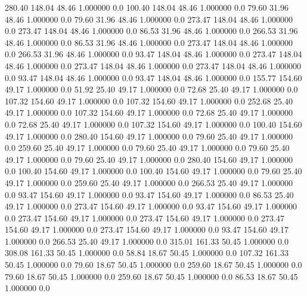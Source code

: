   280.40  148.04   48.46    1.000000    0.0
  100.40  148.04   48.46    1.000000    0.0
   79.60   31.96   48.46    1.000000    0.0
   79.60   31.96   48.46    1.000000    0.0
  273.47  148.04   48.46    1.000000    0.0
  273.47  148.04   48.46    1.000000    0.0
   86.53   31.96   48.46    1.000000    0.0
  266.53   31.96   48.46    1.000000    0.0
   86.53   31.96   48.46    1.000000    0.0
  273.47  148.04   48.46    1.000000    0.0
  266.53   31.96   48.46    1.000000    0.0
   93.47  148.04   48.46    1.000000    0.0
  273.47  148.04   48.46    1.000000    0.0
  273.47  148.04   48.46    1.000000    0.0
  273.47  148.04   48.46    1.000000    0.0
   93.47  148.04   48.46    1.000000    0.0
   93.47  148.04   48.46    1.000000    0.0
  155.77  154.60   49.17    1.000000    0.0
   51.92   25.40   49.17    1.000000    0.0
   72.68   25.40   49.17    1.000000    0.0
  107.32  154.60   49.17    1.000000    0.0
  107.32  154.60   49.17    1.000000    0.0
  252.68   25.40   49.17    1.000000    0.0
  107.32  154.60   49.17    1.000000    0.0
   72.68   25.40   49.17    1.000000    0.0
   72.68   25.40   49.17    1.000000    0.0
  107.32  154.60   49.17    1.000000    0.0
  100.40  154.60   49.17    1.000000    0.0
  280.40  154.60   49.17    1.000000    0.0
   79.60   25.40   49.17    1.000000    0.0
  259.60   25.40   49.17    1.000000    0.0
   79.60   25.40   49.17    1.000000    0.0
   79.60   25.40   49.17    1.000000    0.0
   79.60   25.40   49.17    1.000000    0.0
  280.40  154.60   49.17    1.000000    0.0
  100.40  154.60   49.17    1.000000    0.0
  100.40  154.60   49.17    1.000000    0.0
   79.60   25.40   49.17    1.000000    0.0
  259.60   25.40   49.17    1.000000    0.0
  266.53   25.40   49.17    1.000000    0.0
   93.47  154.60   49.17    1.000000    0.0
   93.47  154.60   49.17    1.000000    0.0
   86.53   25.40   49.17    1.000000    0.0
  273.47  154.60   49.17    1.000000    0.0
   93.47  154.60   49.17    1.000000    0.0
  273.47  154.60   49.17    1.000000    0.0
  273.47  154.60   49.17    1.000000    0.0
  273.47  154.60   49.17    1.000000    0.0
  273.47  154.60   49.17    1.000000    0.0
   93.47  154.60   49.17    1.000000    0.0
  266.53   25.40   49.17    1.000000    0.0
  315.01  161.33   50.45    1.000000    0.0
  308.08  161.33   50.45    1.000000    0.0
   58.84   18.67   50.45    1.000000    0.0
  107.32  161.33   50.45    1.000000    0.0
   79.60   18.67   50.45    1.000000    0.0
  259.60   18.67   50.45    1.000000    0.0
   79.60   18.67   50.45    1.000000    0.0
  259.60   18.67   50.45    1.000000    0.0
   86.53   18.67   50.45    1.000000    0.0
